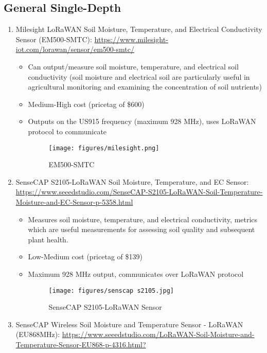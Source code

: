 \documentclass{article}
\begin{document}
\subsection{General Single-Depth}
\begin{enumerate}
\item Milesight LoRaWAN Soil Moisture, Temperature, and Electrical Conductivity Sensor (EM500-SMTC): \url{https://www.milesight-iot.com/lorawan/sensor/em500-smtc/}

\begin{itemize}

\item Can output/measure soil moisture, temperature, and electrical soil conductivity (soil moisture and electrical soil are particularly useful in agricultural monitoring and examining the concentration of soil nutrients)
\item Medium-High cost (pricetag of \$600)
\item Outputs on the US915 frequency (maximum 928 MHz), uses LoRaWAN protocol to communicate

\begin{figure}[htp]
    \centering
    \texttt{[image: figures/milesight.png]}
    \caption{EM500-SMTC}
\end{figure}

\end{itemize}

\item SenseCAP S2105-LoRaWAN Soil Moisture, Temperature, and EC Sensor: \url{https://www.seeedstudio.com/SenseCAP-S2105-LoRaWAN-Soil-Temperature-Moisture-and-EC-Sensor-p-5358.html}
\begin{itemize}

\item Measures soil moisture, temperature, and electrical conductivity, metrics which are useful measurements for assessing soil quality and subsequent plant health.
\item Low-Medium cost (pricetag of \$139)
\item Maximum 928 MHz output, communicates over LoRaWAN protocol

\begin{figure}[htp]
    \centering
    \texttt{[image: figures/senscap s2105.jpg]}
    \caption{SenseCAP S2105-LoRaWAN Sensor}
\end{figure}

\end{itemize}

\item SenseCAP Wireless Soil Moisture and Temperature Sensor - LoRaWAN (EU868MHz): \url{https://www.seeedstudio.com/LoRaWAN-Soil-Moisture-and-Temperature-Sensor-EU868-p-4316.html?}
\begin{itemize}


\end{itemize}
\end{enumerate}
\end{document}
